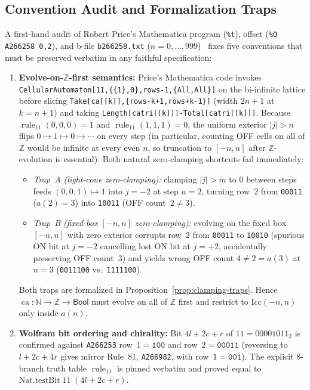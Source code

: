\documentclass[11pt]{article}
\theoremstyle{definition}
\newcommand{\N}{\mathbb{N}}
\newcommand{\Z}{\mathbb{Z}}
\newcommand{\seq}[1]{\texttt{#1}}
\newcommand{\ruleTT}{\operatorname{rule}_{11}}
\newcommand{\ca}{\operatorname{ca}}
\begin{document}
\subsection{Convention Audit and Formalization Traps}
\label{sec:conventions}

A first-hand audit of Robert Price's Mathematica program (\texttt{\%t}), offset (\texttt{\%O A266258 0,2}), and b-file \texttt{b266258.txt} ($n = 0, \dots, 999$)~\cite{oeis266258} fixes five conventions that must be preserved verbatim in any faithful specification:
\begin{enumerate}
\item \textbf{Evolve-on-$\Z$-first semantics:} Price's Mathematica code invokes {\small\nolinkurl{CellularAutomaton[11,{{1},0},rows-1,{All,All}]}} on the bi-infinite lattice before slicing {\small\nolinkurl{Take[ca[[k]],{rows-k+1,rows+k-1}]}} (width $2n + 1$ at $k = n + 1$) and taking {\small\nolinkurl{Length[catri[[k]]]-Total[catri[[k]]]}}. Because $\ruleTT(0,0,0) = 1$ and $\ruleTT(1,1,1) = 0$, the uniform exterior $|j| > n$ flips $0 \mapsto 1 \mapsto 0 \mapsto \cdots$ on every step (in particular, counting OFF cells on all of $\Z$ would be infinite at every even $n$, so truncation to $[-n, n]$ after $\Z$-evolution is essential). Both natural zero-clamping shortcuts fail immediately:
\begin{itemize}
\item \emph{Trap~A (light-cone zero-clamping):} clamping $|j| > m$ to $0$ between steps feeds $(0,0,1) \mapsto 1$ into $j = -2$ at step $n = 2$, turning row~$2$ from \texttt{00011} ($a(2) = 3$) into \texttt{10011} (OFF count~$2 \ne 3$).
\item \emph{Trap~B (fixed-box $[-n, n]$ zero-clamping):} evolving on the fixed box $[-n, n]$ with zero exterior corrupts row~$2$ from \texttt{00011} to \texttt{10010} (spurious ON bit at $j = -2$ cancelling lost ON bit at $j = +2$, accidentally preserving OFF count~$3$) and yields wrong OFF count $4 \ne 2 = a(3)$ at $n = 3$ (\texttt{0011100} vs.\ \texttt{1111100}).
\end{itemize}
Both traps are formalized in Proposition~\ref{prop:clamping-traps}. Hence $\ca : \N \to \Z \to \mathsf{Bool}$ must evolve on all of $\Z$ first and restrict to $\mathrm{Icc}(-n, n)$ only inside $a(n)$.
\item \textbf{Wolfram bit ordering and chirality:} Bit $4l + 2c + r$ of $11 = 00001011_2$ is confirmed against \seq{A266253} row~$1 = \mathtt{100}$ and row~$2 = \mathtt{00011}$ (reversing to $l + 2c + 4r$ gives mirror Rule~81, \seq{A266982}, with row~$1 = \mathtt{001}$). The explicit $8$-branch truth table $\ruleTT$ is pinned verbatim and proved equal to $\mathrm{Nat.testBit}\;11\;(4l + 2c + r)$.

\end{enumerate}
\end{document}
